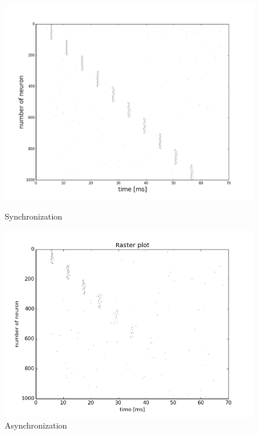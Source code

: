 \documentclass[12pt,a4paper, bibliography=totoc, listof=numbered, footexclude]{scrartcl}
\begin{document}
	\begin{figure}[H]
	    	\begin{minipage}[hbt]{8.2 cm}
	  		\centering
	  		 
	  		  \includegraphics[width=1.0\linewidth]{./Plots/Our_Plots/rasterplot_grosse_schrift}
	  		  \caption{Synchronization}
	  		  \label{fig:rasterplot}
	    		
	    	\end{minipage}
  	    	\hfill
	    	\begin{minipage}[hbt]{8.2 cm}

	    \centering
	    \includegraphics[width=1.0\linewidth]{./Plots/Our_Plots/asynchronization_rasterplot}
	    \caption{Asynchronization}
	    \label{fig:asynchronization_rasterplot}
	    	\end{minipage}
	    	\end{figure}
\end{document}

